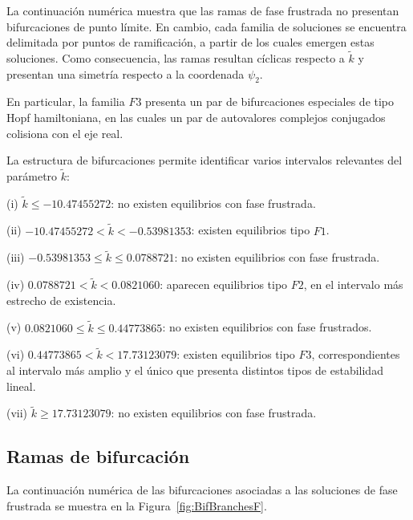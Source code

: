 La continuación numérica muestra que las ramas de fase frustrada no presentan bifurcaciones de punto límite. En cambio, cada familia de soluciones se encuentra delimitada por puntos de ramificación, a partir de los cuales emergen estas soluciones. Como consecuencia, las ramas resultan cíclicas respecto a $\tilde{k}$ y presentan una simetría respecto a la coordenada $\psi_2$.

En particular, la familia $F3$ presenta un par de bifurcaciones especiales de tipo Hopf hamiltoniana, en las cuales un par de autovalores complejos conjugados colisiona con el eje real.

La estructura de bifurcaciones permite identificar varios intervalos relevantes del parámetro $\tilde{k}$:

(i) $\tilde{k} \leq -10.47455272$: no existen equilibrios con fase frustrada.

(ii) $-10.47455272 < \tilde{k} < -0.53981353$: existen equilibrios tipo $F1$.

(iii) $-0.53981353 \leq \tilde{k} \leq 0.0788721$: no existen equilibrios con fase frustrada.

(iv) $0.0788721 < \tilde{k} < 0.0821060$: aparecen equilibrios tipo $F2$, en el intervalo más estrecho de existencia.

(v) $0.0821060 \leq \tilde{k} \leq 0.44773865$: no existen equilibrios con fase frustrados.

(vi) $0.44773865 < \tilde{k} < 17.73123079$: existen equilibrios tipo $F3$, correspondientes al intervalo más amplio y el único que presenta distintos tipos de estabilidad lineal.

(vii) $\tilde{k} \geq 17.73123079$: no existen equilibrios con fase frustrada.

\subsection{Ramas de bifurcación}

La continuación numérica de las bifurcaciones asociadas a las soluciones de fase frustrada se muestra en la Figura~\ref{fig:BifBranchesF}.

